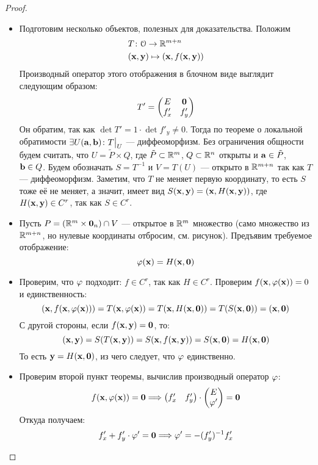 \begin{proof}
    \enewline
    \begin{itemize}
        \item Подготовим несколько объектов, полезных для доказательства.
        Положим
\begin{align*}
    &T \colon \mathcal{O} \to \mathbb{R}^{m + n} \\
    &(\mathbf{x}, \mathbf{y}) \mapsto (\mathbf{x}, f(\mathbf{x}, \mathbf{y}))
\end{align*}
        Производный оператор этого отображения в блочном виде выглядит следующим
        образом:
\[
        T' = \begin{pmatrix}
                E & \mathbf{0} \\
                f'_x & f'_y
             \end{pmatrix}
\]
        Он обратим, так как $\det{T'} = 1 \cdot \det{f'_y} \neq 0$. Тогда по теореме о локальной
        обратимости $\exists U(\mathbf{a}, \mathbf{b})\colon T\big|_U$
        --- диффеоморфизм. Без ограничения общности будем считать, что
        $U = \tilde{P} \times Q$, где $\tilde{P} \subset \mathbb{R}^m$, $Q \subset \mathbb{R}^n$
        открыты и $\mathbf{a} \in \tilde{P}$, $\mathbf{b} \in Q$. Будем обозначать
        $S = T^{-1}$ и $V = T(U)$ --- открыто в $\mathbb{R}^{m + n}$ так как $T$ --- диффеоморфизм.
        Заметим, что $T$ не меняет первую координату, то есть $S$ тоже её не меняет,
        а значит, имеет вид $S(\mathbf{x}, \mathbf{y}) = (\mathbf{x}, H(\mathbf{x}, \mathbf{y}))$, где $H(\mathbf{x}, \mathbf{y}) \in C^r$,
        так как $S \in C^r$.

        \item Пусть $P = (\mathbb{R}^m \times \mathbf{0}_n) \cap V$ --- открытое в
        $\mathbb{R}^m$ множество (само множество из $\mathbb{R}^{m + n}$, но нулевые координаты
        отбросим, см. рисунок). Предъявим требуемое отображение:
\[
    \varphi(\mathbf{x}) = H(\mathbf{x}, \mathbf{0})
\]

        \item Проверим, что $\varphi$ подходит: $f \in C^r$, так как
        $H \in C^r$. Проверим $f(\mathbf{x}, \varphi(\mathbf{x})) = 0$ и единственность:
\[
    (\mathbf{x}, f(\mathbf{x}, \varphi(\mathbf{x}))) = T(\mathbf{x}, \varphi(\mathbf{x})) = T(\mathbf{x}, H(\mathbf{x}, \mathbf{0})) =
    T(S(\mathbf{x}, \mathbf{0})) = (\mathbf{x}, \mathbf{0})
\]
        С другой стороны, если $f(\mathbf{x}, \mathbf{y}) = \mathbf{0}$, то:
\[
    (\mathbf{x}, \mathbf{y}) = S(T(\mathbf{x}, \mathbf{y})) = S(\mathbf{x}, f(\mathbf{x}, \mathbf{y})) = S(\mathbf{x}, \mathbf{0}) = H(\mathbf{x}, \mathbf{0})
\]
        То есть $\mathbf{y} = H(\mathbf{x}, \mathbf{0})$, из чего следует, что $\varphi$ единственно.

        \item Проверим второй пункт теоремы, вычислив производный оператор $\varphi$:
\[
    f(\mathbf{x}, \varphi(\mathbf{x})) = \mathbf{0} \Longrightarrow \begin{pmatrix}
                                f'_x & f'_y
                           \end{pmatrix}
                           \cdot
                           \begin{pmatrix}
                               E \\
                               \varphi'
                           \end{pmatrix} = \mathbf{0}
\]
    Откуда получаем:
\[
    f'_x + f'_y \cdot \varphi' = \mathbf{0} \Longrightarrow \varphi' = -(f'_y)^{-1}f'_x
\]
    \end{itemize}
\end{proof}

